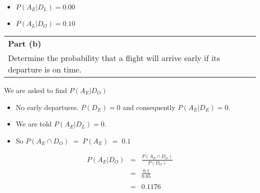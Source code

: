 \documentclass[a4paper,12pt]{article}
\begin{document}
\begin{framed}
\begin{multicols}{2}
\begin{itemize}
\item $P(A_E | D_L) = 0.00$
\item $P(A_L | D_O) = 0.10$
\end{itemize}
\end{multicols}
\end{framed}

\begin{table}[ht!]
 \centering
 \begin{tabular}{|p{15cm}|}
 \hline  \large \smallskip
\noindent \textbf{Part (b)} \\ \large \smallskip  
Determine the probability that a flight will arrive early if its departure is on
time.\smallskip
 \\  \hline
  \end{tabular}
\end{table}

We are asked to find $P ( A_{E} | D_{O} )$


\begin{itemize}
    \item No early departures.  $P( D_E) = 0$ and consequently $P( A_E | D_E) = 0$.
    \item We are told $P( A_E | D_L) = 0$.
    \item So $P ( A_E \cap D_{O} )  \;=\; P ( A_E ) \;=\; 0.1 $
\end{itemize}



\begin{eqnarray*} P ( A_{E} | D_{O} ) &=& 
\frac{P ( A_{E} \cap D_{O} )}{P (  D_{O}
)} \\
&=& \frac{0.1}{0.85}\\  & & \\&=& 0.1176\\
\end{eqnarray*}



\end{document}

